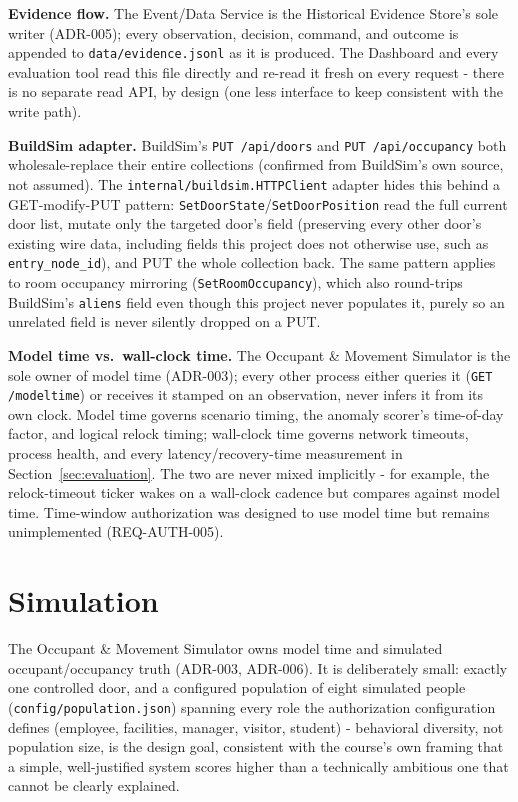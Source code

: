 \documentclass[11pt]{article}
\begin{document}
\textbf{Evidence flow.} The Event/Data Service is the Historical Evidence
Store's sole writer (ADR-005); every observation, decision, command, and
outcome is appended to \texttt{data/evidence.jsonl} as it is produced.
The Dashboard and every evaluation tool read this file directly and
re-read it fresh on every request - there is no separate read API, by
design (one less interface to keep consistent with the write path).

\textbf{BuildSim adapter.} BuildSim's \texttt{PUT /api/doors} and
\texttt{PUT /api/occupancy} both wholesale-replace their entire
collections (confirmed from BuildSim's own source, not assumed). The
\texttt{internal/buildsim.HTTPClient} adapter hides this behind a
GET-modify-PUT pattern: \texttt{SetDoorState}/\texttt{SetDoorPosition}
read the full current door list, mutate only the targeted door's field
(preserving every other door's existing wire data, including fields this
project does not otherwise use, such as \texttt{entry\_node\_id}), and
PUT the whole collection back. The same pattern applies to room occupancy
mirroring (\texttt{SetRoomOccupancy}), which also round-trips BuildSim's
\texttt{aliens} field even though this project never populates it, purely
so an unrelated field is never silently dropped on a PUT.

\textbf{Model time vs.\ wall-clock time.} The Occupant \& Movement
Simulator is the sole owner of model time (ADR-003); every other process
either queries it (\texttt{GET /modeltime}) or receives it stamped on an
observation, never infers it from its own clock. Model time governs
scenario timing, the anomaly scorer's time-of-day factor, and logical
relock timing; wall-clock time governs network timeouts, process health,
and every latency/recovery-time measurement in
Section~\ref{sec:evaluation}. The two are never mixed implicitly - for
example, the relock-timeout ticker wakes on a wall-clock cadence but
compares against model time. Time-window authorization was designed to
use model time but remains unimplemented (REQ-AUTH-005).

\section{Simulation}
\label{sec:simulation}

The Occupant \& Movement Simulator owns model time and simulated
occupant/occupancy truth (ADR-003, ADR-006). It is deliberately small:
exactly one controlled door, and a configured population of eight
simulated people (\texttt{config/population.json}) spanning every role
the authorization configuration defines (employee, facilities, manager,
visitor, student) - behavioral diversity, not population size, is the
design goal, consistent with the course's own framing that a simple,
well-justified system scores higher than a technically ambitious one
that cannot be clearly explained.
\end{document}
